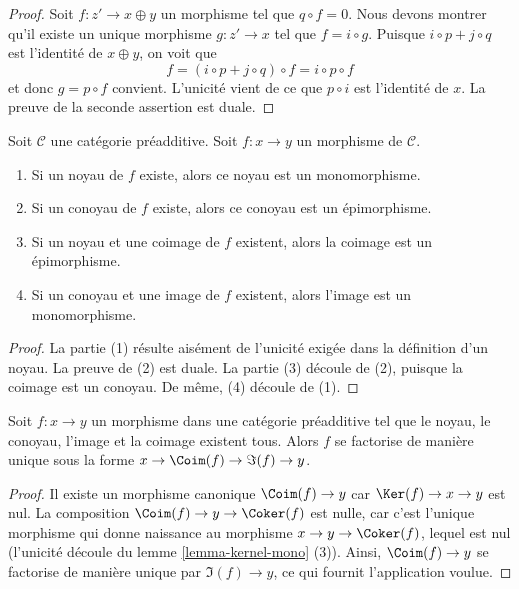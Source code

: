 \begin{proof}
Soit $f : z' \to x \oplus y$ un morphisme tel que $q \circ f = 0$.
Nous devons montrer qu'il existe un unique morphisme $g : z' \to x$
tel que $f = i \circ g$. Puisque $i \circ p + j \circ q$ est l'identité de
$x \oplus y$, on voit que
$$
f = (i \circ p + j \circ q) \circ f = i \circ p \circ f
$$
et donc $g = p \circ f$ convient. L'unicité vient de ce que $p \circ i$
est l'identité de $x$. La preuve de la seconde assertion est duale.
\end{proof}

\begin{lemma}
\label{lemma-kernel-mono}
Soit $\mathcal{C}$ une catégorie préadditive.
Soit $f : x \to y$ un morphisme de $\mathcal{C}$.
\begin{enumerate}
\item Si un noyau de $f$ existe, alors
ce noyau est un monomorphisme.
\item Si un conoyau de $f$ existe, alors
ce conoyau est un épimorphisme.
\item Si un noyau et une coimage de $f$ existent, alors
la coimage est un épimorphisme.
\item Si un conoyau et une image de $f$ existent, alors
l'image est un monomorphisme.
\end{enumerate}
\end{lemma}

\begin{proof}
La partie (1) résulte aisément de l'unicité exigée dans la
définition d'un noyau. La preuve de (2) est duale.
La partie (3) découle de (2), puisque la coimage est un conoyau.
De même, (4) découle de (1).
\end{proof}

\begin{lemma}
\label{lemma-coim-im-map}
Soit $f : x \to y$ un morphisme dans une catégorie préadditive
tel que le noyau, le conoyau, l'image et la coimage existent tous.
Alors $f$ se factorise de manière unique sous la forme
$x \to \Coim(f) \to \Im(f) \to y$.
\end{lemma}

\begin{proof}
Il existe un morphisme canonique $\Coim(f) \to y$
car $\Ker(f) \to x \to y$ est nul.
La composition $\Coim(f) \to y \to \Coker(f)$
est nulle, car c'est l'unique morphisme qui donne
naissance au morphisme $x \to y \to \Coker(f)$, lequel
est nul
(l'unicité découle du
lemme \ref{lemma-kernel-mono} (3)).
Ainsi, $\Coim(f) \to y$ se factorise de manière unique par
$\Im(f) \to y$, ce qui fournit l'application voulue.
\end{proof}

